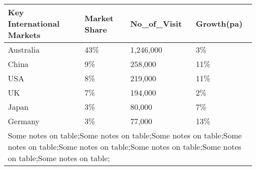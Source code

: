 \begin{tabular}[t]{|p{2.5cm}|p{1cm}|p{1.5cm}|p{1.5cm}|}
  \hline
Key International Markets & Market Share & No\_of\_Visit & Growth(pa) \\ 
  \hline
Australia & 43\% & 1,246,000 & 3\% \\ 
  China & 9\% &   258,000 & 11\% \\ 
  USA & 8\% &   219,000 & 11\% \\ 
  UK & 7\% &   194,000 & 2\% \\ 
  Japan & 3\% &    80,000 & 7\% \\ 
  Germany & 3\% &    77,000 & 13\% \\ 
   \hline
\multicolumn{4}{p{6.5cm}}{{\tiny Some notes on table};Some notes on table;Some notes on table;Some notes on table;Some notes on table;Some notes on table;Some notes on table;Some notes on table;}\\ 
\end{tabular}
